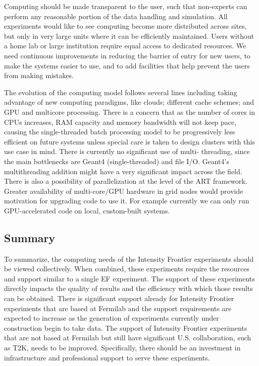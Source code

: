 Computing should be made transparent to the user, such that non-experts can
perform any reasonable portion of the data handling and simulation. All
experiments would like to see computing become more distributed across sites,
but only in very large units where it can be efficiently maintained.  Users
without a home lab or large institution require equal access to dedicated
resources. We need  continuous improvements in reducing the barrier of entry
for new users, to make the systems easier to use, and to add facilities that
help prevent the users from making mistakes.

The evolution of the computing model follows several lines including taking
advantage of new computing paradigms, like clouds; different cache schemes; and
GPU and multicore processing. There is a concern that as the number of cores
in CPUs increases, RAM capacity and memory bandwidth will not keep pace,
causing the single-threaded batch processing model to be progressively less
efficient on future systems unless special care is taken to design clusters
with this use case in mind. There is currently no significant use of multi-
threading, since the main bottlenecks are Geant4 (single-threaded) and file
I/O. Geant4's multithreading addition might have a very significant impact
across the field. There is also a possibility of parallelization at the level
of the ART framework. Greater availability of multi-core/GPU hardware in grid
nodes would provide motivation for upgrading code to use it. For example
currently we can only run GPU-accelerated code on local, custom-built systems.

\subsection{Summary}
To summarize, the computing needs of the Intensity Frontier experiments should be viewed
collectively.  When combined, these experiments require the resources and
support similar to a single EF experiment.  The support of these experiments
directly impacts the quality of results and the efficiency with which those
results can be obtained.  There is significant support already for Intensity Frontier
experiments that are based at Fermilab and the support requirements are
expected to increase as the generation of experiments currently under
construction begin to take data.  The support of Intensity Frontier experiments that are not
based at Fermilab but still have significant U.S. collaboration, such as T2K,
needs to be improved.  Specifically, there should be an investment in
infrastructure and professional support to serve these experiments.

